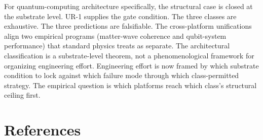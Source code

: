 \documentclass[11pt,a4paper]{article}
\begin{document}
For quantum-computing architecture specifically, the structural case is closed at the substrate level. UR-1 supplies the gate condition. The three classes are exhaustive. The three predictions are falsifiable. The cross-platform unifications align two empirical programs (matter-wave coherence and qubit-system performance) that standard physics treats as separate. The architectural classification is a substrate-level theorem, not a phenomenological framework for organizing engineering effort. Engineering effort is now framed by which substrate condition to lock against which failure mode through which class-permitted strategy. The empirical question is which platforms reach which class's structural ceiling first.

\section*{References}
\end{document}
